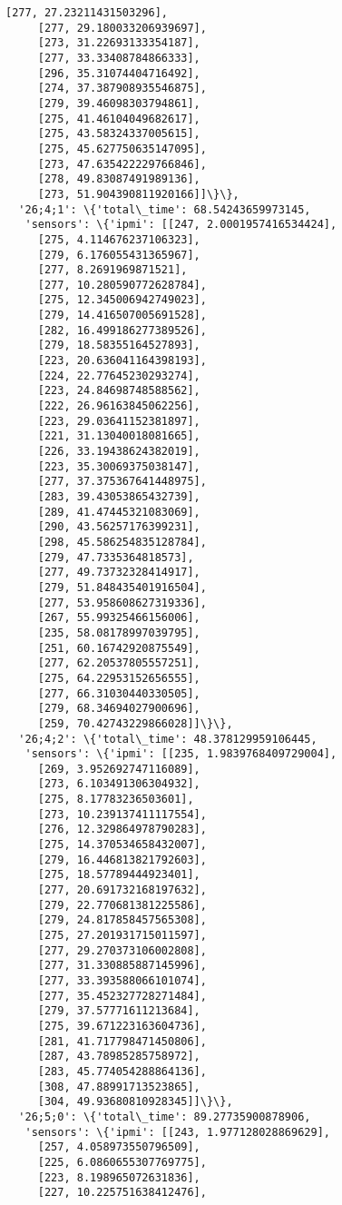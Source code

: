 \documentclass[11pt]{article}
\begin{document}
\begin{tcolorbox}[breakable, size=fbox, boxrule=.5pt, pad at break*=1mm, opacityfill=0]
\begin{Verbatim}[commandchars=\\\{\}]
     [277, 27.23211431503296],
     [277, 29.180033206939697],
     [273, 31.22693133354187],
     [277, 33.33408784866333],
     [296, 35.31074404716492],
     [274, 37.387908935546875],
     [279, 39.46098303794861],
     [275, 41.46104049682617],
     [275, 43.58324337005615],
     [275, 45.627750635147095],
     [273, 47.635422229766846],
     [278, 49.83087491989136],
     [273, 51.904390811920166]]\}\},
  '26;4;1': \{'total\_time': 68.54243659973145,
   'sensors': \{'ipmi': [[247, 2.0001957416534424],
     [275, 4.114676237106323],
     [279, 6.176055431365967],
     [277, 8.2691969871521],
     [277, 10.280590772628784],
     [275, 12.345006942749023],
     [279, 14.416507005691528],
     [282, 16.499186277389526],
     [279, 18.58355164527893],
     [223, 20.636041164398193],
     [224, 22.77645230293274],
     [223, 24.84698748588562],
     [222, 26.96163845062256],
     [223, 29.03641152381897],
     [221, 31.13040018081665],
     [226, 33.19438624382019],
     [223, 35.30069375038147],
     [277, 37.375367641448975],
     [283, 39.43053865432739],
     [289, 41.47445321083069],
     [290, 43.56257176399231],
     [298, 45.586254835128784],
     [279, 47.7335364818573],
     [277, 49.73732328414917],
     [279, 51.848435401916504],
     [277, 53.958608627319336],
     [267, 55.99325466156006],
     [235, 58.08178997039795],
     [251, 60.16742920875549],
     [277, 62.20537805557251],
     [275, 64.22953152656555],
     [277, 66.31030440330505],
     [279, 68.34694027900696],
     [259, 70.42743229866028]]\}\},
  '26;4;2': \{'total\_time': 48.378129959106445,
   'sensors': \{'ipmi': [[235, 1.9839768409729004],
     [269, 3.952692747116089],
     [273, 6.103491306304932],
     [275, 8.17783236503601],
     [273, 10.239137411117554],
     [276, 12.329864978790283],
     [275, 14.370534658432007],
     [279, 16.446813821792603],
     [275, 18.57789444923401],
     [277, 20.691732168197632],
     [279, 22.770681381225586],
     [279, 24.817858457565308],
     [275, 27.201931715011597],
     [277, 29.270373106002808],
     [277, 31.330885887145996],
     [277, 33.393588066101074],
     [277, 35.452327728271484],
     [279, 37.57771611213684],
     [275, 39.671223163604736],
     [281, 41.717798471450806],
     [287, 43.78985285758972],
     [283, 45.774054288864136],
     [308, 47.88991713523865],
     [304, 49.93680810928345]]\}\},
  '26;5;0': \{'total\_time': 89.27735900878906,
   'sensors': \{'ipmi': [[243, 1.977128028869629],
     [257, 4.058973550796509],
     [225, 6.0860655307769775],
     [223, 8.198965072631836],
     [227, 10.225751638412476],

\end{Verbatim}
\end{tcolorbox}
\end{document}
